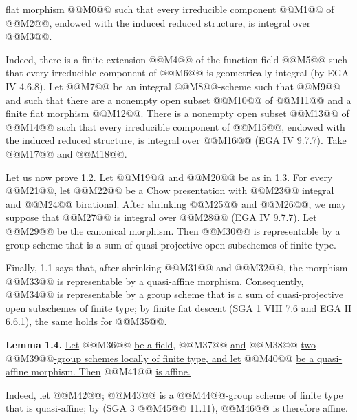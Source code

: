 \uline{flat morphism} @@M0@@ \uline{such that every irreducible component} @@M1@@ \uline{of} @@M2@@\uline{, endowed with the induced reduced structure, is integral over} @@M3@@.

Indeed, there is a finite extension @@M4@@ of the function field @@M5@@ such that every irreducible component of @@M6@@ is geometrically integral (by EGA IV 4.6.8). Let @@M7@@ be an integral @@M8@@-scheme such that @@M9@@ and such that there are a nonempty open subset @@M10@@ of @@M11@@ and a finite flat morphism @@M12@@. There is a nonempty open subset @@M13@@ of @@M14@@ such that every irreducible component of @@M15@@, endowed with the induced reduced structure, is integral over @@M16@@ (EGA IV 9.7.7). Take @@M17@@ and @@M18@@.

Let us now prove 1.2. Let @@M19@@ and @@M20@@ be as in 1.3. For every @@M21@@, let @@M22@@ be a Chow presentation with @@M23@@ integral and @@M24@@ birational. After shrinking @@M25@@ and @@M26@@, we may suppose that @@M27@@ is integral over @@M28@@ (EGA IV 9.7.7). Let @@M29@@ be the canonical morphism. Then @@M30@@ is representable by a group scheme that is a sum of quasi-projective open subschemes of finite type.

Finally, 1.1 says that, after shrinking @@M31@@ and @@M32@@, the morphism @@M33@@ is representable by a quasi-affine morphism. Consequently, @@M34@@ is representable by a group scheme that is a sum of quasi-projective open subschemes of finite type; by finite flat descent (SGA 1 VIII 7.6 and EGA II 6.6.1), the same holds for @@M35@@.

\textbf{Lemma 1.4.} \uline{Let} @@M36@@ \uline{be a field,} @@M37@@ \uline{and} @@M38@@ \uline{two} @@M39@@\uline{-group schemes locally of finite type, and let} @@M40@@ \uline{be a quasi-affine morphism. Then} @@M41@@ \uline{is affine.}

Indeed, let @@M42@@; @@M43@@ is a @@M44@@-group scheme of finite type that is quasi-affine; by (SGA 3 @@M45@@ 11.11), @@M46@@ is therefore affine.

